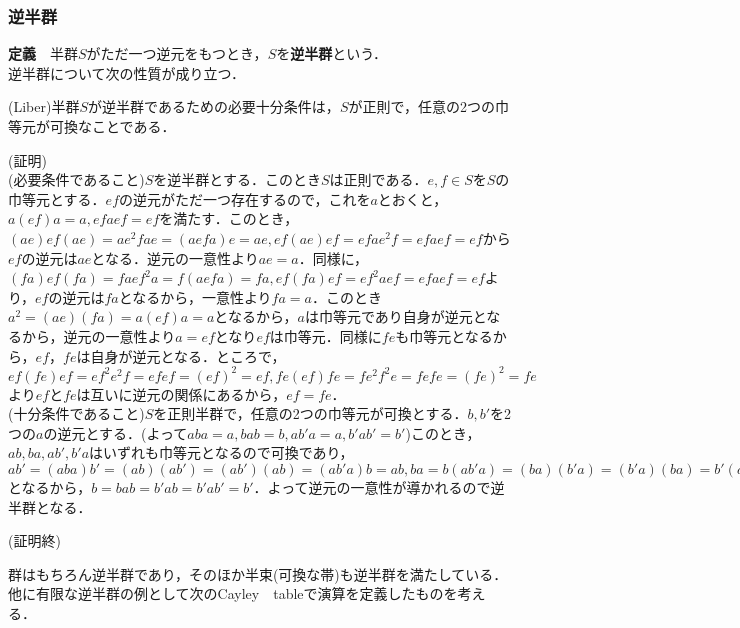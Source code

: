 \documentclass{jsarticle}
\begin{document}
\subsubsection{逆半群}
{\bf 定義}　半群$S$がただ一つ逆元をもつとき，$S$を{\bf 逆半群}という．\\
逆半群について次の性質が成り立つ．
\begin{thm}
(Liber)半群$S$が逆半群であるための必要十分条件は，$S$が正則で，任意の2つの巾等元が可換なことである．
\end{thm}
(証明)\\
(必要条件であること)$S$を逆半群とする．このとき$S$は正則である．$e,f\in S$を$S$の巾等元とする．$ef$の逆元がただ一つ存在するので，これを$a$とおくと，$a(ef)a=a,efaef=ef$を満たす．このとき，$(ae)ef(ae)=ae^2fae=(aefa)e=ae,ef(ae)ef=efae^2f=efaef=ef$から$ef$の逆元は$ae$となる．逆元の一意性より$ae=a$．同様に，$(fa)ef(fa)=faef^2a=f(aefa)=fa,ef(fa)ef=ef^2aef=efaef=ef$より，$ef$の逆元は$fa$となるから，一意性より$fa=a$．このとき$a^2=(ae)(fa)=a(ef)a=a$となるから，$a$は巾等元であり自身が逆元となるから，逆元の一意性より$a=ef$となり$ef$は巾等元．同様に$fe$も巾等元となるから，$ef$，$fe$は自身が逆元となる．ところで，$ef(fe)ef=ef^2e^2f=efef=(ef)^2=ef,fe(ef)fe=fe^2f^2e=fefe=(fe)^2=fe$より$ef$と$fe$は互いに逆元の関係にあるから，$ef=fe$．\\
(十分条件であること)$S$を正則半群で，任意の2つの巾等元が可換とする．$b,b'$を2つの$a$の逆元とする．(よって$aba=a,bab=b,ab'a=a,b'ab'=b'$)このとき，$ab,ba,ab',b'a$はいずれも巾等元となるので可換であり，$ab'=(aba)b'=(ab)(ab')=(ab')(ab)=(ab'a)b=ab,ba=b(ab'a)=(ba)(b'a)=(b'a)(ba)=b'(aba)=b'a$となるから，$b=bab=b'ab=b'ab'=b'$．よって逆元の一意性が導かれるので逆半群となる．
\begin{flushright}
(証明終)
\end{flushright}
群はもちろん逆半群であり，そのほか半束(可換な帯)も逆半群を満たしている．他に有限な逆半群の例として次のCayley　tableで演算を定義したものを考える．
\end{document}
